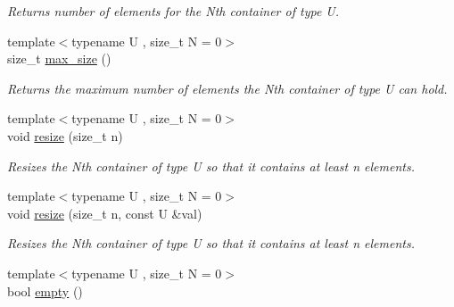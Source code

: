 \begin{DoxyCompactItemize}
\begin{DoxyCompactList}\small\item\em Returns number of elements for the Nth container of type U. \end{DoxyCompactList}\item 
\hypertarget{classheterogeneous_1_1heterodeque_3_01_t_00_01_types_8_8_8_4_ac82f38e1b0b3ba12444036efcce04168}{}{\footnotesize template$<$typename U , size\+\_\+t N = 0$>$ }\\size\+\_\+t \hyperlink{classheterogeneous_1_1heterodeque_3_01_t_00_01_types_8_8_8_4_ac82f38e1b0b3ba12444036efcce04168}{max\+\_\+size} ()\label{classheterogeneous_1_1heterodeque_3_01_t_00_01_types_8_8_8_4_ac82f38e1b0b3ba12444036efcce04168}

\begin{DoxyCompactList}\small\item\em Returns the maximum number of elements the Nth container of type U can hold. \end{DoxyCompactList}\item 
\hypertarget{classheterogeneous_1_1heterodeque_3_01_t_00_01_types_8_8_8_4_a58196c4dcbdb42828df7ef72309111f2}{}{\footnotesize template$<$typename U , size\+\_\+t N = 0$>$ }\\void \hyperlink{classheterogeneous_1_1heterodeque_3_01_t_00_01_types_8_8_8_4_a58196c4dcbdb42828df7ef72309111f2}{resize} (size\+\_\+t n)\label{classheterogeneous_1_1heterodeque_3_01_t_00_01_types_8_8_8_4_a58196c4dcbdb42828df7ef72309111f2}

\begin{DoxyCompactList}\small\item\em Resizes the Nth container of type U so that it contains at least n elements. \end{DoxyCompactList}\item 
\hypertarget{classheterogeneous_1_1heterodeque_3_01_t_00_01_types_8_8_8_4_a4a803dc0b62cdb493ee8bea79560bd98}{}{\footnotesize template$<$typename U , size\+\_\+t N = 0$>$ }\\void \hyperlink{classheterogeneous_1_1heterodeque_3_01_t_00_01_types_8_8_8_4_a4a803dc0b62cdb493ee8bea79560bd98}{resize} (size\+\_\+t n, const U \&val)\label{classheterogeneous_1_1heterodeque_3_01_t_00_01_types_8_8_8_4_a4a803dc0b62cdb493ee8bea79560bd98}

\begin{DoxyCompactList}\small\item\em Resizes the Nth container of type U so that it contains at least n elements. \end{DoxyCompactList}\item 
\hypertarget{classheterogeneous_1_1heterodeque_3_01_t_00_01_types_8_8_8_4_a7692e40241b0d42ffb17d41bd090a6b0}{}{\footnotesize template$<$typename U , size\+\_\+t N = 0$>$ }\\bool \hyperlink{classheterogeneous_1_1heterodeque_3_01_t_00_01_types_8_8_8_4_a7692e40241b0d42ffb17d41bd090a6b0}{empty} ()\label{classheterogeneous_1_1heterodeque_3_01_t_00_01_types_8_8_8_4_a7692e40241b0d42ffb17d41bd090a6b0}


\end{DoxyCompactItemize}
